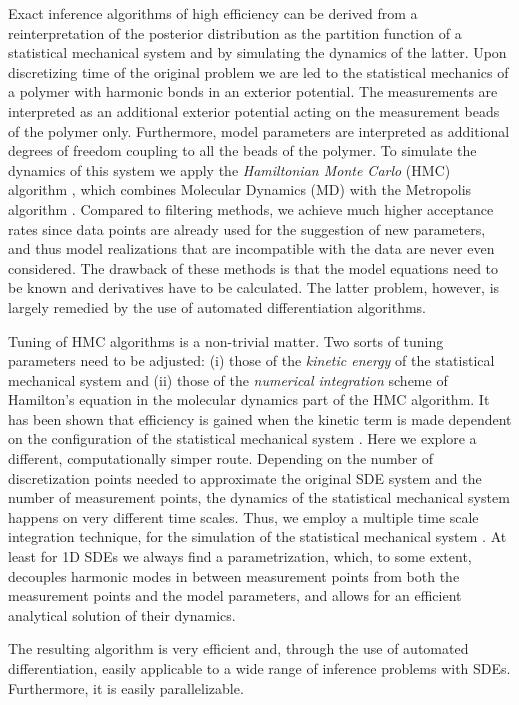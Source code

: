 \documentclass[12pt,a4paper,final]{iopart}
\begin{document}
Exact inference algorithms of high efficiency can be derived from a reinterpretation of the posterior distribution as the partition function of a statistical mechanical system and by simulating the dynamics of the latter.
Upon discretizing time of the original problem we are led to the statistical mechanics of a polymer with harmonic bonds in an exterior potential. The measurements are interpreted as an additional exterior potential acting on the measurement beads of the polymer only.
Furthermore, model parameters are interpreted as additional degrees of freedom coupling to all the beads of the polymer.
To simulate the dynamics of this system we apply the {\em Hamiltonian Monte Carlo} (HMC) algorithm \cite{duane_1987}, which combines Molecular Dynamics (MD) \cite{alder_1959_MD, rahman_1964_MD} with the Metropolis algorithm \cite{metropolis_1953}.
Compared to filtering methods, we achieve much higher acceptance rates since data points are already used for the suggestion of new parameters, and thus model realizations that are incompatible with the data are never even considered.
The drawback of these methods is that the model equations need to be known and derivatives have to be calculated. The latter problem, however, is largely remedied by the use of automated differentiation algorithms.

Tuning of HMC algorithms is a non-trivial matter.
Two sorts of tuning parameters need to be adjusted: (i) those of the {\em kinetic energy} of the statistical mechanical system and (ii) those of the {\em numerical integration} scheme of Hamilton's equation in the molecular dynamics part of the HMC algorithm.
It has been shown that efficiency is gained when the kinetic term is made dependent on the configuration of the statistical mechanical system \cite{girolami_2011_HMC}.
Here we explore a different, computationally simper route.
Depending on the number of discretization points needed to approximate the original SDE system and the number of measurement points, the dynamics of the statistical mechanical system happens on very different time scales.
Thus, we employ a multiple time scale integration technique, for the simulation of the statistical mechanical system \cite{tuckerman_1993}.
At least for 1D SDEs we always find a parametrization, which, to some extent, decouples harmonic modes in between measurement points from both the measurement points and the model parameters, and allows for an efficient analytical solution of their dynamics.

The resulting algorithm is very efficient and, through the use of automated differentiation, easily applicable to a wide range of inference problems with SDEs.
Furthermore, it is easily parallelizable.
\end{document}
